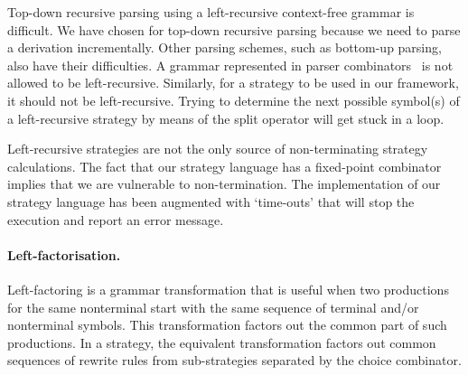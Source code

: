 \documentclass[copyright]{eptcs}
\begin{document}
Top-down recursive parsing using a left-recursive context-free grammar is
difficult. We have chosen for top-down recursive parsing because we need to
parse a derivation incrementally. Other parsing schemes, such as bottom-up
parsing, also have their difficulties. A grammar represented in parser
combinators~\cite{hutton92} is not allowed to be left-recursive. Similarly, for
a strategy to be used in our framework, it should not be left-recursive. Trying
to determine the next possible symbol(s) of a left-recursive strategy by means
of the split operator will get stuck in a loop.

Left-recursive strategies are not the only source of non-terminating strategy
calculations. The fact that our strategy language has a fixed-point combinator
implies that we are vulnerable to non-termination. The implementation of our
strategy language has been augmented with `time-outs' that will stop the
execution and report an error message.

\paragraph{Left-factorisation.}
Left-factoring is a grammar transformation that is useful when two productions
for the same nonterminal start with the same sequence of terminal and/or
nonterminal symbols. This transformation factors out the common part of such
productions. In a strategy, the equivalent transformation factors out common
sequences of rewrite rules from sub-strategies separated by the choice
combinator.
\end{document}
